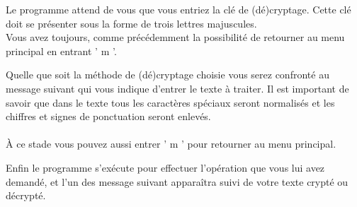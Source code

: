 \documentclass[a4paper,12pt,abstracton,titlepage]{scrartcl}
\begin{document}
\vspace{0.5cm}
{
\label{FE}
}
\vspace{0.5cm}

Le programme attend de vous que vous entriez la clé de (dé)cryptage. Cette clé doit se présenter sous la forme de trois lettres majuscules.\\
Vous avez toujours, comme précédemment la possibilité de retourner au menu principal en entrant ' m '.
\vspace{1cm}

Quelle que soit la méthode de (dé)cryptage choisie vous serez confronté au message suivant qui vous indique d'entrer le texte à traiter. Il est important de savoir que dans le texte tous les caractères spéciaux seront normalisés et les chiffres et signes de ponctuation seront enlevés.\\
\\
À ce stade vous pouvez aussi entrer ' m ' pour retourner au menu principal.

\vspace{0.5cm}
{
\label{FIT}
}
\vspace{0.5cm}

\newpage
Enfin le programme s'exécute pour effectuer l'opération que vous lui avez demandé, et l'un des message suivant apparaîtra suivi de votre texte crypté ou décrypté.

\vspace{0.5cm}
{
\label{FSCT}
\vspace{0.7cm}
\label{FSDT}
}
\vspace{0.5cm}
\end{document}
